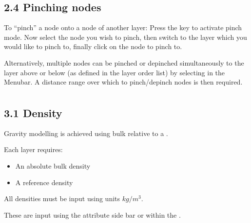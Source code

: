 \documentclass[a4paper,12pt,english]{sphinxmanual}
\begin{document}
\begin{DUlineblock}{0em}
\item[] 
\end{DUlineblock}


\subsection{2.4 Pinching nodes}
\label{\detokenize{manual__layer_nodes:pinching-nodes}}
To “pinch” a node onto a node of another layer: Press the  key to activate pinch mode.
Now select the node you wish to pinch, then switch to the layer which you would like to pinch
to, finally click on the node to pinch to.

Alternatively, multiple nodes can be pinched or depinched simultaneously to the layer above or below
(as defined in the layer order list) by selecting  in the Menubar.
A distance range over which to pinch/depinch nodes is then required.


\section{}
\label{\detokenize{manual__layer_attributes::doc}}\label{\detokenize{manual__layer_attributes:layer-attributes}}
\begin{DUlineblock}{0em}
\item[] 
\end{DUlineblock}


\subsection{3.1 Density}
\label{\detokenize{manual__layer_attributes:density}}
Gravity modelling is achieved using bulk  relative to a .

Each layer requires:
\begin{itemize}
\item {} 
An absolute bulk density

\item {} 
A reference density

\end{itemize}

All densities must be input using units \(kg/m^3\).

These are input using the attribute side bar or within the .
\end{document}
